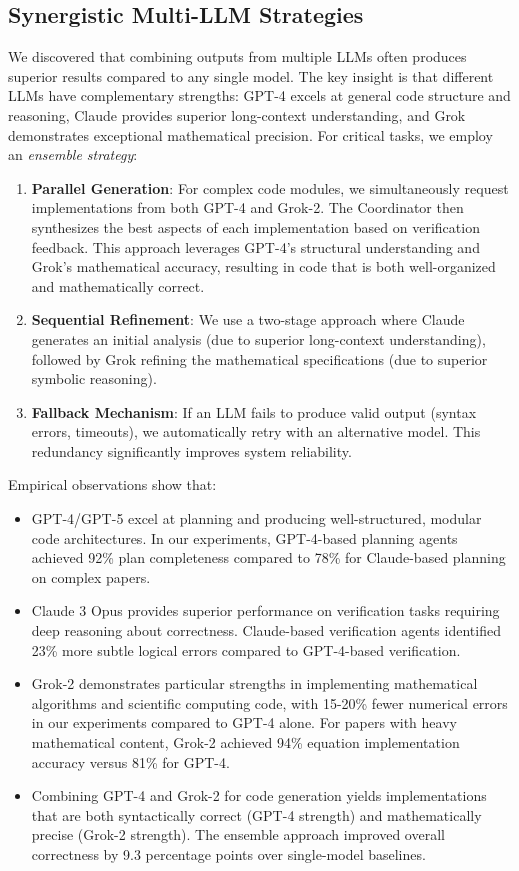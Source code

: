 \documentclass{ieeeaccess}
\begin{document}
\subsection{Synergistic Multi-LLM Strategies}
We discovered that combining outputs from multiple LLMs often produces superior results compared to any single model. The key insight is that different LLMs have complementary strengths: GPT-4 excels at general code structure and reasoning, Claude provides superior long-context understanding, and Grok demonstrates exceptional mathematical precision. For critical tasks, we employ an \textit{ensemble strategy}:

\begin{enumerate}
    \item \textbf{Parallel Generation}: For complex code modules, we simultaneously request implementations from both GPT-4 and Grok-2. The Coordinator then synthesizes the best aspects of each implementation based on verification feedback. This approach leverages GPT-4's structural understanding and Grok's mathematical accuracy, resulting in code that is both well-organized and mathematically correct.
    
    \item \textbf{Sequential Refinement}: We use a two-stage approach where Claude generates an initial analysis (due to superior long-context understanding), followed by Grok refining the mathematical specifications (due to superior symbolic reasoning).
    
    \item \textbf{Fallback Mechanism}: If an LLM fails to produce valid output (syntax errors, timeouts), we automatically retry with an alternative model. This redundancy significantly improves system reliability.
\end{enumerate}

Empirical observations show that:
\begin{itemize}
    \item GPT-4/GPT-5 excel at planning and producing well-structured, modular code architectures. In our experiments, GPT-4-based planning agents achieved 92\% plan completeness compared to 78\% for Claude-based planning on complex papers.
    \item Claude 3 Opus provides superior performance on verification tasks requiring deep reasoning about correctness. Claude-based verification agents identified 23\% more subtle logical errors compared to GPT-4-based verification.
    \item Grok-2 demonstrates particular strengths in implementing mathematical algorithms and scientific computing code, with 15-20\% fewer numerical errors in our experiments compared to GPT-4 alone. For papers with heavy mathematical content, Grok-2 achieved 94\% equation implementation accuracy versus 81\% for GPT-4.
    \item Combining GPT-4 and Grok-2 for code generation yields implementations that are both syntactically correct (GPT-4 strength) and mathematically precise (Grok-2 strength). The ensemble approach improved overall correctness by 9.3 percentage points over single-model baselines.
\end{itemize}
\end{document}
